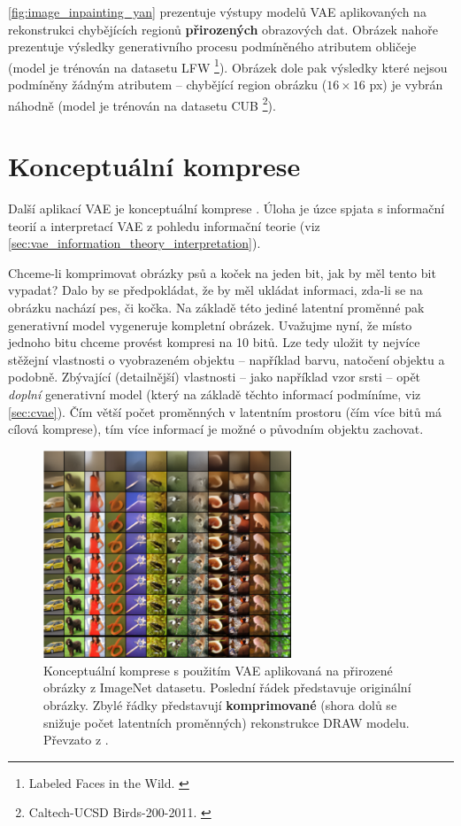 \autoref{fig:image_inpainting_yan} prezentuje výstupy modelů VAE aplikovaných na rekonstrukci chybějících regionů \textbf{přirozených} obrazových dat.
Obrázek nahoře prezentuje výsledky generativního procesu podmíněného atributem obličeje (model je trénován na datasetu LFW \footnote{Labeled Faces in the Wild. \cite{Huang2012}}).
Obrázek dole pak výsledky které nejsou podmíněny žádným atributem – chybějící region obrázku ($16\times16$ px) je vybrán náhodně (model je trénován na datasetu CUB \footnote{Caltech-UCSD Birds-200-2011. \cite{Wah2011}}).

\newpage
\section{Konceptuální komprese}
Další aplikací VAE je konceptuální komprese \cite{Gregor2016}. Úloha je úzce spjata s informační teorií a interpretací VAE z pohledu informační teorie (viz \autoref{sec:vae_information_theory_interpretation}).

Chceme-li komprimovat obrázky psů a koček na jeden bit, jak by měl tento bit vypadat?
Dalo by se předpokládat, že by měl ukládat informaci, zda-li se na obrázku nachází pes, či kočka. 
Na základě této jediné latentní proměnné pak generativní model vygeneruje kompletní obrázek.
Uvažujme nyní, že místo jednoho bitu chceme provést kompresi na 10 bitů.
Lze tedy uložit ty nejvíce stěžejní vlastnosti o vyobrazeném objektu  – například barvu, natočení objektu a podobně.
Zbývající (detailnější) vlastnosti – jako například vzor srsti – opět \emph{doplní} generativní model (který na základě těchto informací podmíníme, viz \autoref{sec:cvae}).
Čím větší počet proměnných v latentním prostoru (čím více bitů má cílová komprese), tím více informací je možné o původním objektu zachovat. \cite{Gregor2016}

\begin{figure}[H]
    \centering
    \includegraphics[width=0.66\textwidth]{figures/applications/conceptual_compression_gregor.png}
    \caption{Konceptuální komprese s použitím VAE aplikovaná na přirozené obrázky z ImageNet datasetu. Poslední řádek představuje originální obrázky. Zbylé řádky představují \textbf{komprimované} (shora dolů se snižuje počet latentních proměnných) rekonstrukce DRAW modelu. Převzato z \textcite{Gregor2016}.}
    \label{fig:conceptual_compression_gregor}
\end{figure}

